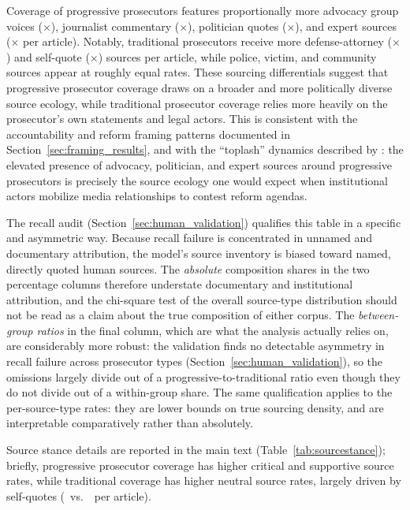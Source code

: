 \documentclass[12pt, letterpaper]{article}
\begin{document}
\begin{appendices}
Coverage of progressive prosecutors features proportionally more advocacy group voices (\AdvocacyRatio$\times$), journalist commentary (\JournalistRatio$\times$), politician quotes (\PoliticianRatio$\times$), and expert sources (\ExpertRatio$\times$ per article). Notably, traditional prosecutors receive more defense-attorney (\DefenseRateRatio$\times$) and self-quote (\SelfQuoteRateRatio$\times$) sources per article, while police, victim, and community sources appear at roughly equal rates. These sourcing differentials suggest that progressive prosecutor coverage draws on a broader and more politically diverse source ecology, while traditional prosecutor coverage relies more heavily on the prosecutor's own statements and legal actors. This is consistent with the accountability and reform framing patterns documented in Section~\ref{sec:framing_results}, and with the ``toplash'' dynamics described by \citet{goldstein2024}: the elevated presence of advocacy, politician, and expert sources around progressive prosecutors is precisely the source ecology one would expect when institutional actors mobilize media relationships to contest reform agendas.

The recall audit (Section~\ref{sec:human_validation}) qualifies this table in a specific and asymmetric way. Because recall failure is concentrated in unnamed and documentary attribution, the model's source inventory is biased toward named, directly quoted human sources. The \emph{absolute} composition shares in the two percentage columns therefore understate documentary and institutional attribution, and the chi-square test of the overall source-type distribution should not be read as a claim about the true composition of either corpus. The \emph{between-group ratios} in the final column, which are what the analysis actually relies on, are considerably more robust: the validation finds no detectable asymmetry in recall failure across prosecutor types (Section~\ref{sec:human_validation}), so the omissions largely divide out of a progressive-to-traditional ratio even though they do not divide out of a within-group share. The same qualification applies to the per-source-type rates: they are lower bounds on true sourcing density, and are interpretable comparatively rather than absolutely.

Source stance details are reported in the main text (Table~\ref{tab:sourcestance}); briefly, progressive prosecutor coverage has higher critical and supportive source rates, while traditional coverage has higher neutral source rates, largely driven by self-quotes (\TradSelfQuoteRate\ vs.\ \ProgSelfQuoteRate\ per article).


\end{appendices}
\end{document}
